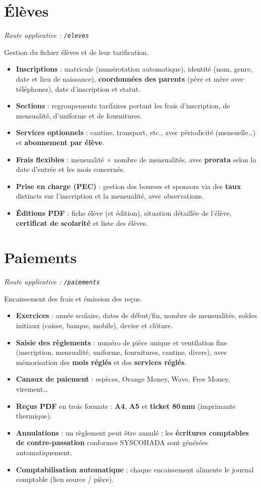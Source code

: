 \documentclass[11pt,a4paper]{report}
\newcommand{\feat}[1]{\item #1}
\newcommand{\modtag}[1]{{\small\color{sagigray}\textit{Route applicative : \texttt{#1}}}}
\begin{document}
\section{Élèves}
\modtag{/eleves}

\noindent Gestion du fichier élèves et de leur tarification.
\begin{itemize}
\feat{\textbf{Inscriptions} : matricule (numérotation automatique), identité
(nom, genre, date et lieu de naissance), \textbf{coordonnées des parents}
(père et mère avec téléphones), date d'inscription et statut.}
\feat{\textbf{Sections} : regroupements tarifaires portant les frais
d'inscription, de mensualité, d'uniforme et de fournitures.}
\feat{\textbf{Services optionnels} : cantine, transport, etc., avec
périodicité (mensuelle\ldots) et \textbf{abonnement par élève}.}
\feat{\textbf{Frais flexibles} : mensualité $\times$ nombre de mensualités,
avec \textbf{prorata} selon la date d'entrée et les mois concernés.}
\feat{\textbf{Prise en charge (PEC)} : gestion des bourses et sponsors via des
\textbf{taux} distincts sur l'inscription et la mensualité, avec observations.}
\feat{\textbf{Éditions PDF} : fiche élève (et édition), situation détaillée de
l'élève, \textbf{certificat de scolarité} et liste des élèves.}
\end{itemize}

\section{Paiements}
\modtag{/paiements}

\noindent Encaissement des frais et émission des reçus.
\begin{itemize}
\feat{\textbf{Exercices} : année scolaire, dates de début/fin, nombre de
mensualités, soldes initiaux (caisse, banque, mobile), devise et clôture.}
\feat{\textbf{Saisie des règlements} : numéro de pièce unique et ventilation
fine (inscription, mensualité, uniforme, fournitures, cantine, divers),
avec mémorisation des \textbf{mois réglés} et des \textbf{services réglés}.}
\feat{\textbf{Canaux de paiement} : espèces, Orange Money, Wave, Free Money,
virement\ldots}
\feat{\textbf{Reçus PDF} en trois formats : \textbf{A4}, \textbf{A5} et
\textbf{ticket 80\,mm} (imprimante thermique).}
\feat{\textbf{Annulations} : un règlement peut être annulé ; les
\textbf{écritures comptables de contre-passation} conformes SYSCOHADA sont
générées automatiquement.}
\feat{\textbf{Comptabilisation automatique} : chaque encaissement alimente le
journal comptable (lien source / pièce).}
\end{itemize}
\end{document}
